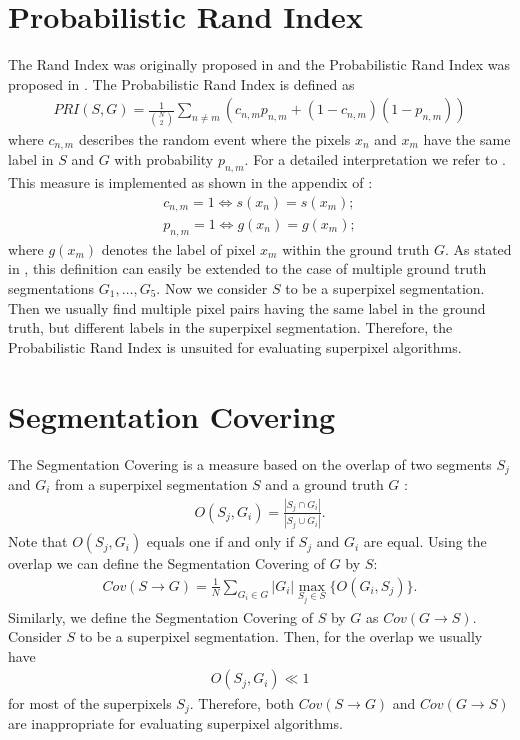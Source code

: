 \section{Probabilistic Rand Index}

The Rand Index was originally proposed in \cite{Rand:1971} and the Probabilistic Rand Index was proposed in \cite{UnnikrishnanPantofaruHebert:2007}. The Probabilistic Rand Index is defined as
\begin{align}
	PRI(S, G) = \frac{1}{{N \choose 2}} \sum_{n \neq m} (c_{n,m}p_{n,m} + (1 - c_{n,m})(1 - p_{n,m}))
\end{align}
where $c_{n,m}$ describes the random event where the pixels $x_n$ and $x_m$ have the same label in $S$ and $G$ with probability $p_{n,m}$. For a detailed interpretation we refer to \cite{UnnikrishnanPantofaruHebert:2007}. This measure is implemented as shown in the appendix of \cite{UnnikrishnanPantofaruHebert:2007}:
\begin{align}
	c_{n,m} = 1 \Leftrightarrow s(x_n) = s(x_m);\\
	p_{n,m} = 1 \Leftrightarrow g(x_n) = g(x_m);
\end{align}
where $g(x_m)$ denotes the label of pixel $x_m$ within the ground truth $G$. As stated in \cite{UnnikrishnanPantofaruHebert:2007}, this definition can easily be extended to the case of multiple ground truth segmentations $G_1,\ldots,G_5$. Now we consider $S$ to be a superpixel segmentation. Then we usually find multiple pixel pairs having the same label in the ground truth, but different labels in the superpixel segmentation. Therefore, the Probabilistic Rand Index is unsuited for evaluating superpixel algorithms.

\section{Segmentation Covering}

The Segmentation Covering is a measure based on the overlap of two segments $S_j$ and $G_i$ from a superpixel segmentation $S$ and a ground truth $G$ \cite{MartinFowlkesMalik:2004}:
\begin{align}
	O(S_j, G_i) = \frac{|S_j \cap G_i|}{|S_j \cup G_i|}.
\end{align}
Note that $O(S_j, G_i)$ equals one if and only if $S_j$ and $G_i$ are equal. Using the overlap we can define the Segmentation Covering of $G$ by $S$:
\begin{align}
	Cov(S \rightarrow G) = \frac{1}{N} \sum_{G_i \in G} |G_i| \max_{S_j \in S} \{O(G_i, S_j)\}.
\end{align}
Similarly, we define the Segmentation Covering of $S$ by $G$ as $Cov(G \rightarrow S)$. Consider $S$ to be a superpixel segmentation. Then, for the overlap we usually have
\begin{align}
	O(S_j, G_i) \ll 1
\end{align}
for most of the superpixels $S_j$. Therefore, both $Cov(S \rightarrow G)$ and $Cov(G \rightarrow S)$ are inappropriate for evaluating superpixel algorithms.	